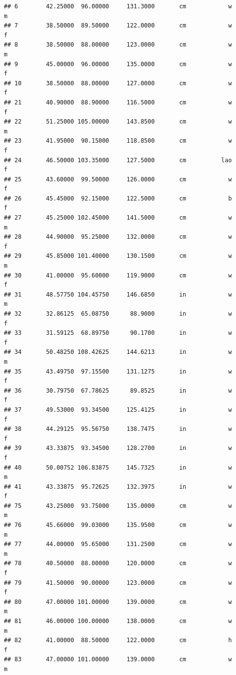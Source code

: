\documentclass[]{article}
\begin{document}
\begin{verbatim}
## 6        42.25000  96.00000     131.3000       cm            w         m
## 7        38.50000  89.50000     122.0000       cm            w         f
## 8        38.50000  88.00000     123.0000       cm            w         m
## 9        45.00000  96.00000     135.0000       cm            w         f
## 10       38.50000  88.00000     127.0000       cm            w         f
## 21       40.90000  88.90000     116.5000       cm            w         f
## 22       51.25000 105.00000     143.8500       cm            w         m
## 23       41.95000  90.15000     118.8500       cm            w         f
## 24       46.50000 103.35000     127.5000       cm          lao         f
## 25       43.60000  99.50000     126.0000       cm            w         f
## 26       45.45000  92.15000     122.5000       cm            b         f
## 27       45.25000 102.45000     141.5000       cm            w         m
## 28       44.90000  95.25000     132.0000       cm            w         f
## 29       45.85000 101.40000     130.1500       cm            w         m
## 30       41.00000  95.60000     119.9000       cm            w         f
## 31       48.57750 104.45750     146.6850       in            w         m
## 32       32.86125  65.08750      88.9000       in            w         f
## 33       31.59125  68.89750      90.1700       in            w         f
## 34       50.48250 108.42625     144.6213       in            w         m
## 35       43.49750  97.15500     131.1275       in            w         f
## 36       30.79750  67.78625      89.8525       in            w         f
## 37       49.53000  93.34500     125.4125       in            w         f
## 38       44.29125  95.56750     138.7475       in            w         f
## 39       43.33875  93.34500     128.2700       in            w         f
## 40       50.00752 106.83875     145.7325       in            w         m
## 41       43.33875  95.72625     132.3975       in            w         f
## 75       43.25000  93.75000     135.0000       cm            w         m
## 76       45.66000  99.03000     135.9500       cm            w         m
## 77       44.00000  95.65000     131.2500       cm            w         m
## 78       40.50000  88.00000     120.0000       cm            w         f
## 79       41.50000  90.00000     123.0000       cm            w         f
## 80       47.00000 101.00000     139.0000       cm            w         m
## 81       46.00000 100.00000     138.0000       cm            w         m
## 82       41.00000  88.50000     122.0000       cm            h         f
## 83       47.00000 101.00000     139.0000       cm            w         m

\end{verbatim}
\end{document}
